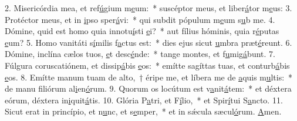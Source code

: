 2. Misericórdia mea, et ref\uline{ú}gium m\uline{e}um:~* suscéptor meus, et liber\uline{á}tor m\uline{e}us:
3. Protéctor meus, et in \uline{i}pso sper\uline{á}vi:~* qui subdit pópulum m\uline{e}um s\uline{u}b me.
4. Dómine, quid est homo quia innotu\uline{í}sti \uline{e}i?~* aut fílius hóminis, quia r\uline{é}putas \uline{e}um?
5. Homo vanitáti s\uline{í}milis f\uline{a}ctus est:~* dies ejus sicut \uline{u}mbra præt\uline{é}reunt.
6. Dómine, inclína cælos tuos, \uline{e}t desc\uline{é}nde:~* tange montes, et f\uline{u}mig\uline{á}bunt.
7. Fúlgura coruscatiónem, et dissip\uline{á}bis \uline{e}os:~* emítte sagíttas tuas, et conturb\uline{á}bis \uline{e}os.
8. Emítte manum tuam de alto,~† éripe me, et líbera me de \uline{a}quis m\uline{u}ltis:~* de manu filiórum al\uline{i}en\uline{ó}rum.
9. Quorum os locútum est v\uline{a}nit\uline{á}tem:~* et déxtera eórum, déxtera in\uline{i}quit\uline{á}tis.
10. Glória P\uline{a}tri, et F\uline{í}lio,~* et Spir\uline{í}tui S\uline{a}ncto.
11. Sicut erat in princípio, et n\uline{u}nc, et s\uline{e}mper,~* et in sǽcula sæcul\uline{ó}rum. \uline{A}men.
